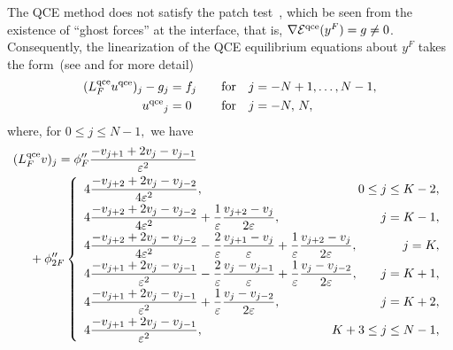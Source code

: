 \documentclass[12pt,reqno]{amsart}
\begin{document}
The QCE method does not satisfy the patch test~\cite{mingyang,Dobson:2008b,Dobson:2008c,Shenoy:1999a},
which be seen from the existence of
``ghost forces'' at the interface, that is, $\nabla {{\mathcal{E}}^{{\rm qce}}}(y^F) = g
\neq 0$. Consequently, the linearization of the QCE equilibrium
equations about $y^F$ takes the form~(see \cite[Section
2.4]{Dobson:2008b} and \cite[Section 2.4]{Dobson:2008c} for more
detail)
\begin{equation}
  \label{qce}
  \begin{aligned}
    ({L^{{\rm qce}}_F}{u^{{\rm qce}}})_j-g_j&=f_j&\quad&\text{for} \quad j = -N+1, \dots, N-1,\\
    {u^{{\rm qce}}}_{j}&=0&\quad&\text{for} \quad j = -N,\,N,
  \end{aligned}
\end{equation}
where, for $0 \leq j \leq N-1,$ we have
\begin{equation*}
\begin{split}
({L^{{\rm qce}}_F} {v})_j &= \phi''_F \frac{-v_{j+1} +2 v_j - v_{j-1}}{{\varepsilon}^2} \\
& \hspace{-8mm} + \phi_{2F}'' \left\{ \begin{array}{lr}
\displaystyle
 4 \frac{-v_{j+2} +2 v_j - v_{j-2}}{4 {\varepsilon}^2},
& \hspace{-8mm} 0 \leq j \leq K-2, \\[6pt]
\displaystyle
 4 \frac{-v_{j+2} +2 v_j - v_{j-2}}{4 {\varepsilon}^2}
+ \frac{1}{\varepsilon} \frac{v_{j+2} - v_{j}}{2 {\varepsilon}},  & j = K-1, \\[6pt]
\displaystyle
 4 \frac{-v_{j+2} +2 v_j - v_{j-2}}{4 {\varepsilon}^2}
- \frac{2}{\varepsilon} \frac{v_{j+1} - v_{j}}{\varepsilon}
+ \frac{1}{\varepsilon} \frac{v_{j+2} - v_{j}}{2 {\varepsilon}},
& j = K, \\[6pt]
\displaystyle
4 \frac{-v_{j+1} +2 v_j - v_{j-1}}{{\varepsilon}^2}
-  \frac{2}{\varepsilon} \frac{v_{j} - v_{j-1}}{\varepsilon}
+ \frac{1}{\varepsilon} \frac{v_{j} - v_{j-2}}{2 {\varepsilon}}, & \quad j = K+1, \\[6pt]
\displaystyle
4 \frac{-v_{j+1} +2 v_j - v_{j-1}}{{\varepsilon}^2}
+ \frac{1}{\varepsilon} \frac{v_{j} - v_{j-2}}{2 {\varepsilon}}, & j = K+2, \\[6pt]
\displaystyle
4 \frac{-v_{j+1} +2 v_j - v_{j-1}}{{\varepsilon}^2}, &
\hspace{-16mm} K+3 \leq j \leq N-1,
\end{array}\right.
\end{split}
\end{equation*}
\end{document}
